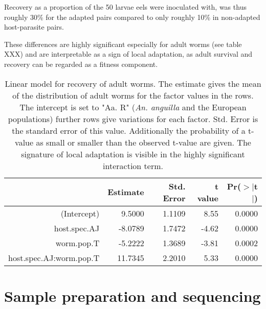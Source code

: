 \documentclass[10pt]{article}
\begin{document}
Recovery as a proportion of the 50 larvae eels were inoculated with,
was thus roughly 30\% for the adapted pairs compared to only roughly
10\% in non-adapted host-parasite pairs.

These differences are highly significant especially for adult worms
(see table XXX) and are interpretable as a sign of local
adaptation, as adult survival and recovery can be regarded as a
fitness component.


\begin{table}[h]
\begin{center}
\begin{tabular}{rrrrr}
  \hline
 & Estimate & Std. Error & t value & Pr($>$$|$t$|$) \\ 
  \hline
  (Intercept) & 9.5000 & 1.1109 & 8.55 & 0.0000 \\ 
  host.spec.AJ & -8.0789 & 1.7472 & -4.62 & 0.0000 \\ 
  worm.pop.T & -5.2222 & 1.3689 & -3.81 & 0.0002 \\ 
  host.spec.AJ:worm.pop.T & 11.7345 & 2.2010 & 5.33 & 0.0000 \\ 
   \hline
\end{tabular}

\caption[Linear model for recovery]{Linear model for recovery of adult
  worms. The estimate gives the mean of the distribution of adult
  worms for the factor values in the rows. The intercept is set to
  "Aa. R" (\textit{An. anguilla} and the European populations) further
  rows give variations for each factor. Std. Error is the standard
  error of this value. Additionally the probability of a t-value as
  small or smaller than the observed t-value are given. The signature
  of local adaptation is visible in the highly significant interaction
  term.}
\label{tab:ad-sig}
\end{center}
\end{table}

\section{Sample preparation and sequencing}
\end{document}

